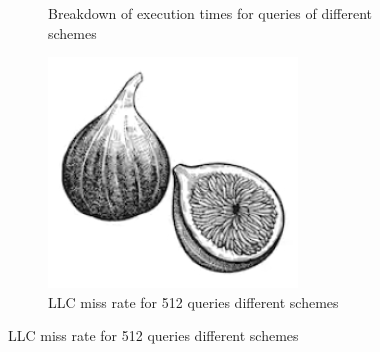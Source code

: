 \documentclass[lettersize,journal]{IEEEtran} %
\begin{document}
\begin{figure}[!t]
\begin{subfigure}{0.3\columnwidth}
      \caption{Breakdown of execution times for queries of different schemes}
      \label{fig:subfig2}
    \end{subfigure}
    \hfill
    \begin{subfigure}{0.3\columnwidth}
      \includegraphics[width=\linewidth]{fig1.png}
      \caption{LLC miss rate for 512 queries different schemes}
      \label{fig:subfig3}
    \end{subfigure}
  
    \medskip
  

\end{figure}
\end{document}
